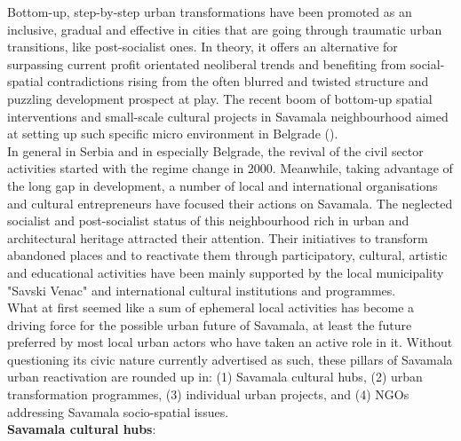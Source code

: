 \documentclass[11pt]{report}
\begin{document}
Bottom-up, step-by-step urban transformations have been promoted as an inclusive, gradual and effective in cities that are going through traumatic urban transitions, like post-socialist ones. In theory, it offers an alternative for surpassing current profit orientated neoliberal trends and benefiting from social-spatial contradictions rising from the often blurred and twisted structure and puzzling development prospect at play.
The recent boom of bottom-up spatial interventions and small-scale cultural projects in Savamala neighbourhood aimed at setting up such specific micro environment in Belgrade (\cite{(Urban Incubator Belgrade 2013)}).
\\
In general in Serbia and in especially Belgrade, the revival of the civil sector activities started with the regime change in 2000.
Meanwhile, taking advantage of the long gap in development, a number of local and international organisations and cultural entrepreneurs have focused their actions on Savamala.
The neglected socialist and post-socialist status of this neighbourhood rich in urban and architectural heritage attracted their attention. Their initiatives to transform abandoned places and to reactivate them through participatory, cultural, artistic and educational activities have been mainly supported by the local municipality "Savski Venac" and international cultural institutions and programmes.
\\
What at first seemed like a sum of ephemeral local activities has become a driving force for the possible urban future of Savamala, at least the future preferred by most local urban actors who have taken an active role in it.
Without questioning its civic nature currently advertised as such, these pillars of Savamala urban reactivation are rounded up in:
(1) Savamala cultural hubs,
(2) urban transformation programmes,
(3) individual urban projects, 
and
(4) NGOs addressing Savamala socio-spatial issues.
\\
\textbf{Savamala cultural hubs}: 
\end{document}
